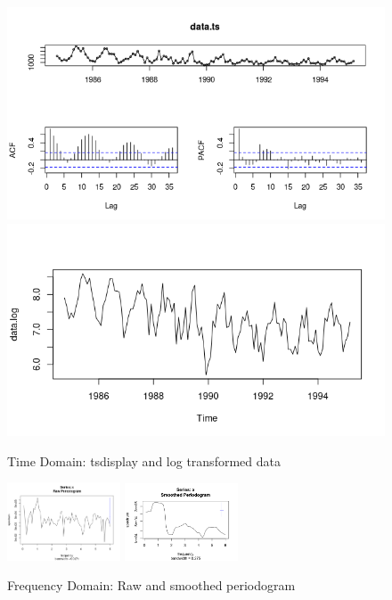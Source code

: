 \documentclass[journal, a4paper]{IEEEtran}
\begin{document}
\begin{figure}[H]
\begin{center}
\includegraphics[scale=0.4]{fig1/data_tsdisplay.png}
\includegraphics[scale=0.4]{fig1/data_log.png}
\caption{Time Domain: tsdisplay and log transformed data}
\label{fig1:tsdisplay}
\end{center}
\end{figure}



\begin{figure}[H]
\begin{center}
\includegraphics[width=0.3\textwidth]{fig1/frequncyPlot.png}
\includegraphics[width=0.3\textwidth]{fig1/smooth.png}
\caption{Frequency Domain: Raw and smoothed periodogram}
\label{fig1:frequency}
\end{center}
\end{figure}
\end{document}
